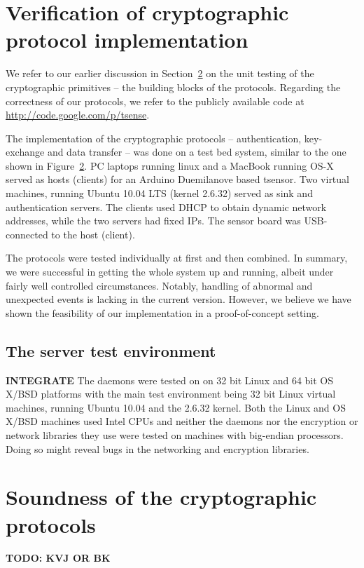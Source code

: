 \section{Verification of cryptographic protocol implementation}

We refer to our earlier discussion in Section~\ref{} on the unit testing of the cryptographic primitives -- the building blocks of the protocols. Regarding the correctness of our protocols, we refer to the publicly available code at \url{http://code.google.com/p/tsense}.

The implementation of the cryptographic protocols -- authentication, key-exchange and data transfer -- was done on a test bed system, similar to the one shown in Figure~\ref{}. PC laptops running linux and a MacBook running OS-X served as hosts (clients) for an Arduino Duemilanove based tsensor. Two virtual machines, running Ubuntu 10.04 LTS (kernel 2.6.32) served as sink and authentication servers. The clients used DHCP to obtain dynamic network addresses, while the two servers had fixed IPs. The sensor board was USB-connected to the host (client).

The protocols were tested individually at first and then combined. In summary, we were successful in getting the whole system up and running, albeit under fairly well controlled circumstances. Notably, handling of abnormal and unexpected events is lacking in the current version. However, we believe we have shown the feasibility of our implementation in a proof-of-concept setting.

\subsection{ The server test environment}
\textbf{INTEGRATE}
The daemons were tested on  on 32 bit Linux and 64 bit OS X/BSD platforms with the main test environment being 32 bit Linux  virtual machines, running Ubuntu 10.04 and the  2.6.32 kernel. Both the Linux and OS X/BSD machines used Intel CPUs and neither the daemons nor the encryption or network libraries they use were tested on machines with big-endian processors. Doing so might reveal bugs in the networking and encryption libraries. 

\section{Soundness of the cryptographic protocols}

\textbf{TODO: KVJ OR BK}

